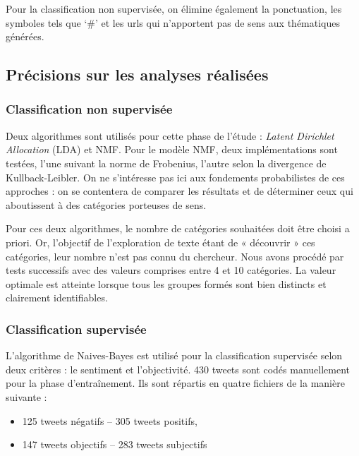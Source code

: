 Pour la classification non supervisée, on élimine également la ponctuation, les symboles tels que ‘\#’ et les urls qui n’apportent pas de sens aux thématiques générées.


\subsection{Précisions sur les analyses réalisées}

\subsubsection{Classification non supervisée}
Deux algorithmes sont utilisés pour cette phase de l’étude : \textit{Latent Dirichlet Allocation} (LDA) et NMF. Pour le modèle NMF, deux implémentations sont testées, l’une suivant la norme de Frobenius, l’autre selon la divergence de Kullback-Leibler. On ne s’intéresse pas ici aux fondements probabilistes de ces approches : on se contentera de comparer les résultats et de déterminer ceux qui aboutissent à des catégories porteuses de sens.

Pour ces deux algorithmes, le nombre de catégories souhaitées doit être choisi a priori. Or, l’objectif de l’exploration de texte étant de « découvrir » ces catégories, leur nombre n’est pas connu du chercheur. Nous avons procédé par tests successifs avec des valeurs comprises entre 4 et 10 catégories. La valeur optimale est atteinte lorsque tous les groupes formés sont bien distincts et clairement identifiables.

\subsubsection{Classification supervisée}
L’algorithme de Naives-Bayes est utilisé pour la classification supervisée selon deux critères : le sentiment et l’objectivité. 430 tweets sont codés manuellement pour la phase d’entraînement. Ils sont répartis en quatre fichiers de la manière suivante :
\begin{itemize}
    \item 125 tweets négatifs – 305 tweets positifs,
    \item 147 tweets objectifs – 283 tweets subjectifs
\end{itemize}

